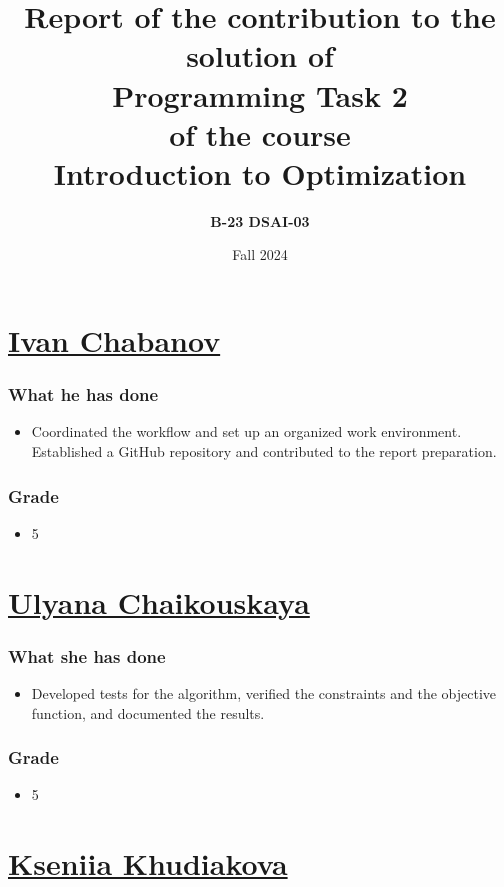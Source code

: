 \documentclass{article}
\title{Report of the \textbf{contribution} to the solution of \\ \textbf{Programming Task 2} \\ of the course \\ \textbf{Introduction to Optimization}}
\author{\textbf{B-23 DSAI-03}}
\date{Fall 2024}
\begin{document}
\maketitle

\section{\href{mailto:i.chabanov@innopolis.university}{Ivan Chabanov}}
\subsubsection*{What he has done}
\begin{itemize}
    \item Coordinated the workflow and set up an organized work environment. Established a GitHub repository and contributed to the report preparation.
\end{itemize}
\subsubsection*{Grade}
\begin{itemize}
    \item 5
\end{itemize}

\section{\href{mailto:u.chaikouskaya@innopolis.university}{Ulyana Chaikouskaya}}
\subsubsection*{What she has done}
\begin{itemize}
    \item Developed tests for the algorithm, verified the constraints and the objective function, and documented the results.
\end{itemize}
\subsubsection*{Grade}
\begin{itemize}
    \item 5
\end{itemize}

\section{\href{mailto:k.khudiakova@innopolis.university}{Kseniia Khudiakova}}
\end{document}

